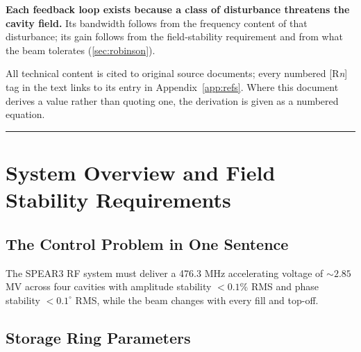 \begin{keynote}
\textbf{Each feedback loop exists because a class of disturbance threatens the cavity field.} Its bandwidth follows from the frequency content of that disturbance; its gain follows from the field-stability requirement and from what the beam tolerates (\cref{sec:robinson}).
\end{keynote}



All technical content is cited to original source documents; every numbered [R\textit{n}] tag in the text links to its entry in Appendix~\ref{app:refs}. Where this document derives a value rather than quoting one, the derivation is given as a numbered equation.

\begin{center}\rule{0.5\linewidth}{0.5pt}\end{center}

\section{System Overview and Field Stability Requirements}\label{sec:overview}


\subsection{The Control Problem in One Sentence}\label{sec:control-problem}


The SPEAR3 RF system must deliver a 476.3 MHz accelerating voltage of \(\sim 2.85\) MV across four cavities with amplitude stability \(< 0.1\%\) RMS and phase stability \(< 0.1^\circ\) RMS, while the beam  changes with every fill and top-off.

\subsection{Storage Ring Parameters}\label{sec:ring-params}


